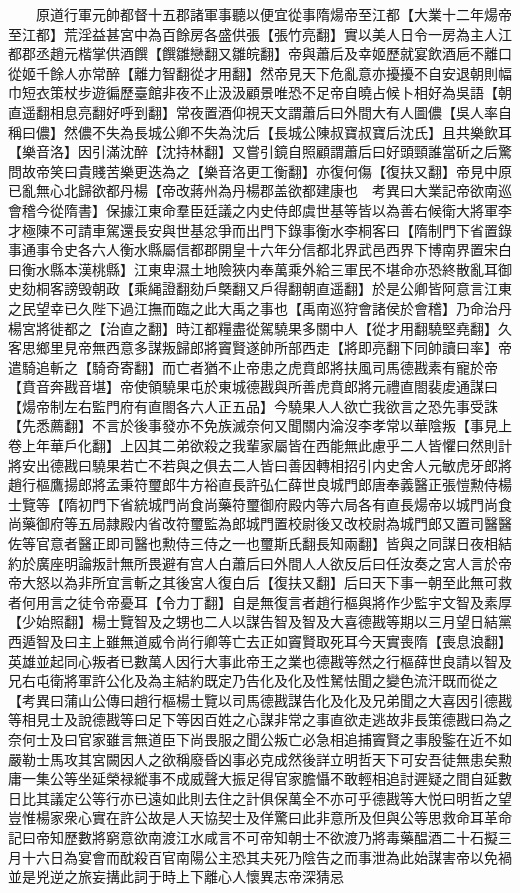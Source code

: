 　　原道行軍元帥都督十五郡諸軍事聽以便宜從事隋煬帝至江都【大業十二年煬帝至江都】荒淫益甚宮中為百餘房各盛供張【張竹亮翻】實以美人日令一房為主人江都郡丞趙元楷掌供酒饌【饌雛戀翻又雛皖翻】帝與蕭后及幸姬歷就宴飲酒巵不離口從姬千餘人亦常醉【離力智翻從才用翻】然帝見天下危亂意亦擾擾不自安退朝則幅巾短衣策杖步遊徧歷臺館非夜不止汲汲顧景唯恐不足帝自曉占候卜相好為吳語【朝直遥翻相息亮翻好呼到翻】常夜置酒仰視天文謂蕭后曰外間大有人圖儂【吳人率自稱曰儂】然儂不失為長城公卿不失為沈后【長城公陳叔寶叔寶后沈氏】且共樂飲耳【樂音洛】因引滿沈醉【沈持林翻】又嘗引鏡自照顧謂蕭后曰好頭頸誰當斫之后驚問故帝笑曰貴賤苦樂更迭為之【樂音洛更工衡翻】亦復何傷【復扶又翻】帝見中原已亂無心北歸欲都丹楊【帝改蔣州為丹楊郡盖欲都建康也　考異曰大業記帝欲南巡會稽今從隋書】保據江東命羣臣廷議之内史侍郎虞世基等皆以為善右候衛大將軍李才極陳不可請車駕還長安與世基忿爭而出門下錄事衡水李桐客曰【隋制門下省置錄事通事令史各六人衡水縣屬信都郡開皇十六年分信都北界武邑西界下博南界置宋白曰衡水縣本漢桃縣】江東卑濕土地險狹内奉萬乘外給三軍民不堪命亦恐終散亂耳御史劾桐客謗毁朝政【乘䋲證翻劾戶槩翻又戶得翻朝直遥翻】於是公卿皆阿意言江東之民望幸已久陛下過江撫而臨之此大禹之事也【禹南巡狩會諸侯於會稽】乃命治丹楊宮將徙都之【治直之翻】時江都糧盡從駕驍果多關中人【從才用翻驍堅堯翻】久客思鄉里見帝無西意多謀叛歸郎將竇賢遂帥所部西走【將即亮翻下同帥讀曰率】帝遣騎追斬之【騎奇寄翻】而亡者猶不止帝患之虎賁郎將扶風司馬德戡素有寵於帝【賁音奔戡音堪】帝使領驍果屯於東城德戡與所善虎賁郎將元禮直閤裴䖍通謀曰【煬帝制左右監門府有直閤各六人正五品】今驍果人人欲亡我欲言之恐先事受誅【先悉薦翻】不言於後事發亦不免族滅奈何又聞關内淪沒李孝常以華陰叛【事見上卷上年華戶化翻】上囚其二弟欲殺之我輩家屬皆在西能無此慮乎二人皆懼曰然則計將安出德戡曰驍果若亡不若與之俱去二人皆曰善因轉相招引内史舍人元敏虎牙郎將趙行樞鷹揚郎將孟秉符璽郎牛方裕直長許弘仁薛世良城門郎唐奉義醫正張愷勲侍楊士覽等【隋初門下省統城門尚食尚藥符璽御府殿内等六局各有直長煬帝以城門尚食尚藥御府等五局隷殿内省改符璽監為郎城門置校尉後又改校尉為城門郎又置司醫醫佐等官意者醫正即司醫也勲侍三侍之一也璽斯氏翻長知兩翻】皆與之同謀日夜相結約於廣座明論叛計無所畏避有宫人白蕭后曰外間人人欲反后曰任汝奏之宮人言於帝帝大怒以為非所宜言斬之其後宮人復白后【復扶又翻】后曰天下事一朝至此無可救者何用言之徒令帝憂耳【令力丁翻】自是無復言者趙行樞與將作少監宇文智及素厚【少始照翻】楊士覽智及之甥也二人以謀告智及智及大喜德戡等期以三月望日結黨西遁智及曰主上雖無道威令尚行卿等亡去正如竇賢取死耳今天實喪隋【喪息浪翻】英雄並起同心叛者已數萬人因行大事此帝王之業也德戡等然之行樞薛世良請以智及兄右屯衛將軍許公化及為主結約既定乃告化及化及性駑怯聞之變色流汗既而從之　【考異曰蒲山公傳曰趙行樞楊士覽以司馬德戡謀告化及化及兄弟聞之大喜因引德戡等相見士及說德戡等曰足下等因百姓之心謀非常之事直欲走逃故非長策德戡曰為之奈何士及曰官家雖言無道臣下尚畏服之聞公叛亡必急相追捕竇賢之事殷鍳在近不如嚴勒士馬攻其宮闕因人之欲稱廢昏凶事必克成然後詳立明哲天下可安吾徒無患矣勲庸一集公等坐延榮禄縱事不成威聲大振足得官家膽懾不敢輕相追討遲疑之間自延數日比其議定公等行亦已遠如此則去住之計俱保萬全不亦可乎德戡等大悦曰明哲之望豈惟楊家衆心實在許公故是人天協契士及佯驚曰此非意所及但與公等思救命耳革命記曰帝知歷數將窮意欲南渡江水咸言不可帝知朝士不欲渡乃將毒藥醖酒二十石擬三月十六日為宴會而酖殺百官南陽公主恐其夫死乃陰告之而事泄為此始謀害帝以免禍並是兇逆之旅妄搆此詞于時上下離心人懷異志帝深猜忌